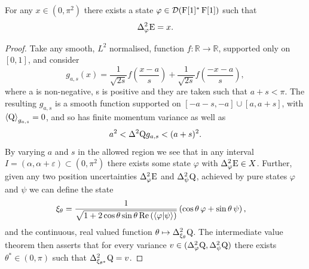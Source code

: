 \begin{lem}\label{lem:box-ur-all-points-filled}
  For any $x\in (0, \pi^2)$ there exists a state $\varphi\in\mathcal{D}(\operatorname{F}[1]^*\operatorname{F}[1])$  such that 
  \begin{align}
    \var[\varphi]{\ope} = x.
  \end{align}
\end{lem}
\begin{proof}
Take any smooth, $L^2$ normalised, function $f: \mathbb{R} \to \mathbb{R}$, supported only on $[0,1]$, and consider
\begin{equation}
	g_{a,s}(x) = \frac{1}{\sqrt{2s}}f\left(\frac{x-a}{s}\right) +\frac{1}{\sqrt{2s}}f\left(\frac{-x-a}{s}\right),
\end{equation}
where a is non-negative, s is positive and they are taken such that $a+s < \pi$. The resulting $g_{a,s}$ is a smooth function supported on $[-a-s, -a] \cup [a,a+s]$, with $\left\langle{\operatorname{Q}}\right\rangle_{g_{a,s}} = 0$, and so has finite momentum variance as well as
\begin{equation}
	a^2 < \var{\opq}{g_{a,s}} < (a+s)^2.
\end{equation}
By varying $a$ and $s$ in the allowed region we see that in any interval $I = (\alpha, \alpha+\varepsilon) \subset (0,\pi^2)$ there exists some state $\varphi$ with $\var[\varphi]{\ope} \in X$. Further, given any two position uncertainties $\var[\varphi]{\ope}$ and $\var[\psi]{\opq}$, achieved by pure states $\varphi$ and $\psi$ we can define the state
\begin{align}
	\xi_\theta &= \frac{1}{\sqrt{1+2\cos\theta\sin\theta\operatorname{Re}\left(\langle \varphi|\psi\rangle\right)}}\left(\cos\theta\,\varphi + \sin\theta\,\psi \right),
\end{align}
and the continuous, real valued function $\theta\mapsto\var[\xi_\theta]{\opq}$. The intermediate value theorem then asserts that for every variance $v\in(\var[\varphi]{\opq},\var[\psi]{\opq})$ there exists $\theta^*\in(0,\pi)$ such that $\var[\xi_{\theta^*}]{\opq} = v$.
\end{proof}

